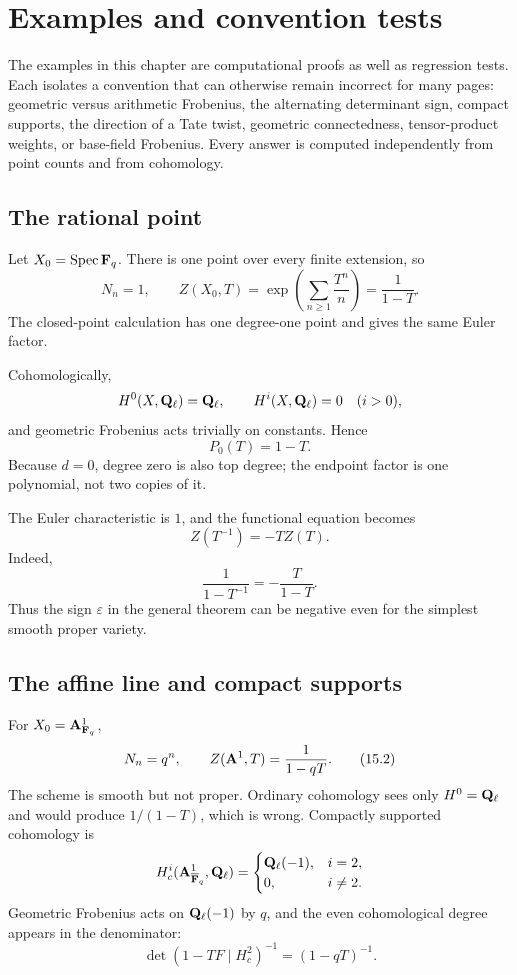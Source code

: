 \chapter{Examples and convention tests}
\label{chap:examples}

The examples in this chapter are computational proofs as well as
regression tests.  Each isolates a convention that can otherwise remain
incorrect for many pages: geometric versus arithmetic Frobenius, the
alternating determinant sign, compact supports, the direction of a Tate
twist, geometric connectedness, tensor-product weights, or base-field
Frobenius.  Every answer is computed independently from point counts and
from cohomology.

\section{The rational point}

Let \(X_0=\operatorname{Spec}\mathbf F_q\).  There is one point over every finite extension, so
\[
 N_n=1,\qquad
 Z(X_0,T)=\exp\left(\sum_{n\geq1}\frac{T^n}{n}\right)
          =\frac1{1-T}.
 \tag{15.1}\label{eq:zeta-point}
\]
The closed-point calculation has one degree-one point and gives the same
Euler factor.

Cohomologically,
\[
 H^0(X,\mathbf Q_\ell)=\mathbf Q_\ell,\qquad H^i(X,\mathbf Q_\ell)=0\quad(i>0),
\]
and geometric Frobenius acts trivially on constants.  Hence
\[
 P_0(T)=1-T.
\]
Because \(d=0\), degree zero is also top degree; the endpoint factor is
one polynomial, not two copies of it.

The Euler characteristic is \(1\), and the functional equation becomes
\[
 Z(T^{-1})=-T Z(T).
\]
Indeed,
\[
 \frac1{1-T^{-1}}=-\frac{T}{1-T}.
\]
Thus the sign \(\varepsilon\) in the general theorem can be negative even
for the simplest smooth proper variety.

\section{The affine line and compact supports}

For \(X_0=\mathbf A^1_{\mathbf F_q}\),
\[
 N_n=q^n,\qquad
 Z(\mathbf A^1,T)=\frac1{1-qT}.
 \tag{15.2}\label{eq:zeta-A1}
\]
The scheme is smooth but not proper.  Ordinary cohomology sees only
\(H^0=\mathbf Q_\ell\) and would produce \(1/(1-T)\), which is wrong.  Compactly
supported cohomology is
\[
 H_c^i(\mathbf A^1_{\overline{\mathbf F}_q},\mathbf Q_\ell)=
 \begin{cases}
   \mathbf Q_\ell(-1),&i=2,\\
   0,&i\neq2.
 \end{cases}
\]
Geometric Frobenius acts on \(\mathbf Q_\ell(-1)\) by \(q\), and the even
cohomological degree appears in the denominator:
\[
 \det(1-TF\mid H_c^2)^{-1}=(1-qT)^{-1}.
\]

